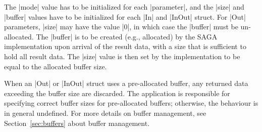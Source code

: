   The |mode| value has to be initialized for each |parameter|,
  and the |size| and |buffer| values have to be initialized for each
  |In| and |InOut| struct. For |Out| parameters, |size| may have
  the value |0|, in which case the |buffer| must be un-allocated. The |buffer|
  is to be created (e.g., allocated) by the SAGA
  implementation upon arrival of the result data, with a size
  that is sufficient to hold all result data.  The |size| value is then
  set by the implementation to be equal to the allocated buffer size.  


  When an |Out| or |InOut| struct uses a pre-allocated buffer,
  any returned data exceeding the buffer size are discarded.
  The application is responsible for specifying correct buffer
  sizes for pre-allocated buffers; otherwise, the behaviour is in
  general undefined.  For more details on buffer management,
  see Section~\ref{sec:buffers} about buffer management.

  

